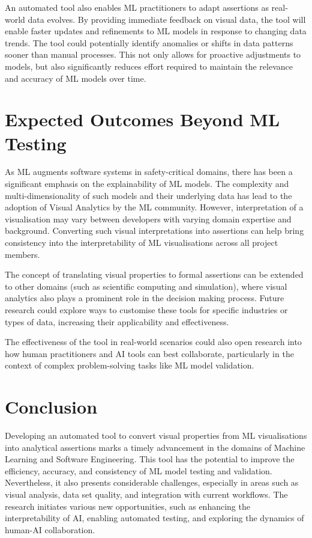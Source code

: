 \documentclass[sigconf]{acmart}
\begin{document}
An automated tool also enables ML practitioners to adapt assertions as
real-world data evolves. By providing immediate feedback on visual
data, the tool will enable faster updates and refinements to ML models
in response to changing data trends. The tool could potentially
identify anomalies or shifts in data patterns sooner than manual
processes. This not only allows for proactive adjustments to models,
but also significantly reduces effort required to maintain the
relevance and accuracy of ML models over time.

\section{Expected Outcomes Beyond ML Testing}

As ML augments software systems in safety-critical domains, there has
been a significant emphasis on the explainability of ML models. The
complexity and multi-dimensionality of such models and their
underlying data has lead to the adoption of Visual Analytics by the ML
community. However, interpretation of a visualisation may vary between
developers with varying domain expertise and background. Converting
such visual interpretations into assertions can help bring consistency
into the interpretability of ML visualisations across all project
members.

The concept of translating visual properties to formal assertions can
be extended to other domains (such as scientific computing and
simulation), where visual analytics also plays a prominent role in the
decision making process. Future research could explore ways to
customise these tools for specific industries or types of data,
increasing their applicability and effectiveness.

The effectiveness of the tool in real-world scenarios could also open
research into how human practitioners and AI tools can best
collaborate, particularly in the context of complex problem-solving
tasks like ML model validation.

\section{Conclusion}

Developing an automated tool to convert visual properties from ML
visualisations into analytical assertions marks a timely advancement
in the domains of Machine Learning and Software Engineering. This tool
has the potential to improve the efficiency, accuracy, and consistency
of ML model testing and validation. Nevertheless, it also presents
considerable challenges, especially in areas such as visual analysis,
data set quality, and integration with current workflows. The research
initiates various new opportunities, such as enhancing the
interpretability of AI, enabling automated testing, and exploring the
dynamics of human-AI collaboration.

 
\end{document}

